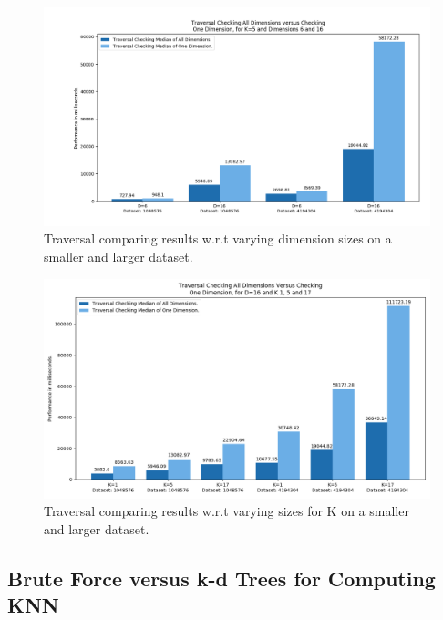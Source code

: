 \begin{figure}[H]
\centering
\includegraphics[width=1\textwidth]{pics/plot-figs/trav-k5-no-1.png}
\caption{Traversal comparing results w.r.t varying dimension sizes on a smaller and larger dataset.}
\end{figure}


\begin{figure}[H]
\centering
\includegraphics[width=1\textwidth]{pics/plot-figs/trav-d16.png}
\caption{Traversal comparing results w.r.t varying sizes for K on a smaller and larger dataset.}
\end{figure}





\subsection{Brute Force versus k-d Trees for Computing KNN}







